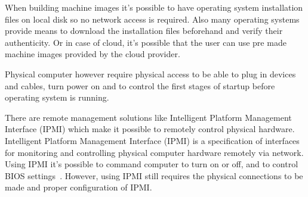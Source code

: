 When building machine images it's possible to have operating system
installation files on local disk so no network access is
required. Also many operating systems provide means to download the
installation files beforehand and verify their authenticity. Or in
case of cloud, it's possible that the user can use pre made machine
images provided by the cloud provider.

Physical computer however require physical access to be able to plug
in devices and cables, turn power on and to control the first stages
of startup before operating system is running.

There are remote management solutions like Intelligent Platform
Management Interface (IPMI) which make it possible to remotely control
physical hardware. Intelligent Platform Management Interface (IPMI) is
a specification of interfaces for monitoring and controlling physical
computer hardware remotely via network. Using IPMI it's possible to
command computer to turn on or off, and to control BIOS
settings~\cite{ipmi-spec}. However, using IPMI still requires the
physical connections to be made and proper configuration of IPMI.

